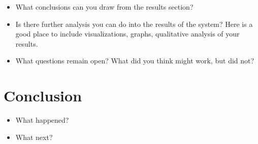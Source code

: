 \documentclass[10pt]{article}
\begin{document}
\begin{itemize}
\item What conclusions can you draw from the results section?
\item Is there further analysis you can do into the results of the system? Here
is a good place to include visualizations, graphs, qualitative analysis of your
results.

\item  What questions remain open? What did you think might work, but did not?
\end{itemize}




\section{Conclusion}

\begin{itemize}
\item What happened?
\item What next?
\end{itemize}









\end{document}
